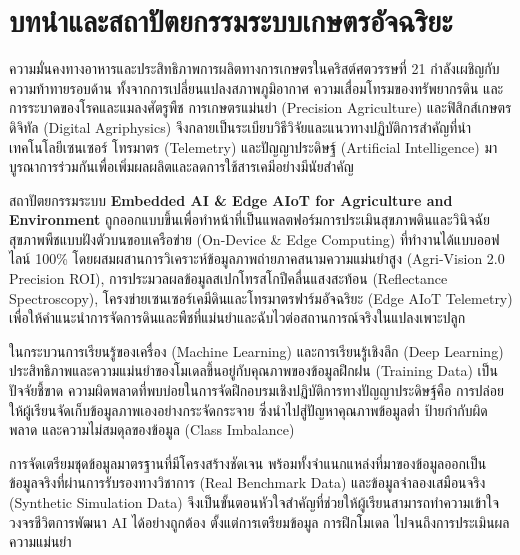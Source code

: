 \chapter{บทนำและสถาปัตยกรรมระบบเกษตรอัจฉริยะ}
\label{ch:introduction}

ความมั่นคงทางอาหารและประสิทธิภาพการผลิตทางการเกษตรในคริสต์ศตวรรษที่ 21 กำลังเผชิญกับความท้าทายรอบด้าน ทั้งจากการเปลี่ยนแปลงสภาพภูมิอากาศ ความเสื่อมโทรมของทรัพยากรดิน และการระบาดของโรคและแมลงศัตรูพืช การเกษตรแม่นยำ (Precision Agriculture) และฟิสิกส์เกษตรดิจิทัล (Digital Agriphysics) จึงกลายเป็นระเบียบวิธีวิจัยและแนวทางปฏิบัติการสำคัญที่นำเทคโนโลยีเซนเซอร์ โทรมาตร (Telemetry) และปัญญาประดิษฐ์ (Artificial Intelligence) มาบูรณาการร่วมกันเพื่อเพิ่มผลผลิตและลดการใช้สารเคมีอย่างมีนัยสำคัญ

สถาปัตยกรรมระบบ \textbf{Embedded AI \& Edge AIoT for Agriculture and Environment} ถูกออกแบบขึ้นเพื่อทำหน้าที่เป็นแพลตฟอร์มการประเมินสุขภาพดินและวินิจฉัยสุขภาพพืชแบบฝังตัวบนขอบเครือข่าย (On-Device \& Edge Computing) ที่ทำงานได้แบบออฟไลน์ 100\% โดยผสมผสานการวิเคราะห์ข้อมูลภาพถ่ายภาคสนามความแม่นยำสูง (Agri-Vision 2.0 Precision ROI), การประมวลผลข้อมูลสเปกโทรสโกปีคลื่นแสงสะท้อน (Reflectance Spectroscopy), โครงข่ายเซนเซอร์เคมีดินและโทรมาตรฟาร์มอัจฉริยะ (Edge AIoT Telemetry) เพื่อให้คำแนะนำการจัดการดินและพืชที่แม่นยำและฉับไวต่อสถานการณ์จริงในแปลงเพาะปลูก

\label{sec:data_importance}

ในกระบวนการเรียนรู้ของเครื่อง (Machine Learning) และการเรียนรู้เชิงลึก (Deep Learning) ประสิทธิภาพและความแม่นยำของโมเดลขึ้นอยู่กับคุณภาพของข้อมูลฝึกฝน (Training Data) เป็นปัจจัยชี้ขาด ความผิดพลาดที่พบบ่อยในการจัดฝึกอบรมเชิงปฏิบัติการทางปัญญาประดิษฐ์คือ การปล่อยให้ผู้เรียนจัดเก็บข้อมูลภาพเองอย่างกระจัดกระจาย ซึ่งนำไปสู่ปัญหาคุณภาพข้อมูลต่ำ ป้ายกำกับผิดพลาด และความไม่สมดุลของข้อมูล (Class Imbalance)

การจัดเตรียมชุดข้อมูลมาตรฐานที่มีโครงสร้างชัดเจน พร้อมทั้งจำแนกแหล่งที่มาของข้อมูลออกเป็นข้อมูลจริงที่ผ่านการรับรองทางวิชาการ (Real Benchmark Data) และข้อมูลจำลองเสมือนจริง (Synthetic Simulation Data) จึงเป็นขั้นตอนหัวใจสำคัญที่ช่วยให้ผู้เรียนสามารถทำความเข้าใจวงจรชีวิตการพัฒนา AI ได้อย่างถูกต้อง ตั้งแต่การเตรียมข้อมูล การฝึกโมเดล ไปจนถึงการประเมินผลความแม่นยำ

\label{sec:objectives}

